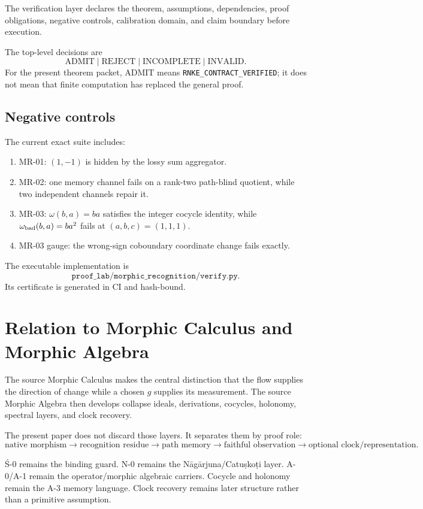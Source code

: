 \documentclass[11pt]{article}
\newcommand{\status}[1]{\texttt{#1}}
\begin{document}
The verification layer declares the theorem, assumptions, dependencies, proof obligations, negative controls, calibration domain, and claim boundary before execution.

The top-level decisions are
\[
\boxed{
\text{ADMIT}\mid\text{REJECT}\mid\text{INCOMPLETE}\mid\text{INVALID}.
}
\]
For the present theorem packet, ADMIT means \status{RNKE\_CONTRACT\_VERIFIED}; it does not mean that finite computation has replaced the general proof.

\subsection{Negative controls}

The current exact suite includes:
\begin{enumerate}
\item MR-01: \((1,-1)\) is hidden by the lossy sum aggregator.
\item MR-02: one memory channel fails on a rank-two path-blind quotient, while two independent channels repair it.
\item MR-03: \(\omega(b,a)=ba\) satisfies the integer cocycle identity, while \(\omega_{\rm bad}(b,a)=ba^2\) fails at \((a,b,c)=(1,1,1)\).
\item MR-03 gauge: the wrong-sign coboundary coordinate change fails exactly.
\end{enumerate}

The executable implementation is
\[
\texttt{proof\_lab/morphic\_recognition/verify.py}.
\]
Its certificate is generated in CI and hash-bound.

\section{Relation to Morphic Calculus and Morphic Algebra}

The source Morphic Calculus makes the central distinction that the flow supplies the direction of change while a chosen \(g\) supplies its measurement. The source Morphic Algebra then develops collapse ideals, derivations, cocycles, holonomy, spectral layers, and clock recovery.

The present paper does not discard those layers. It separates them by proof role:
\[
\boxed{
\text{native morphism}
\to
\text{recognition residue}
\to
\text{path memory}
\to
\text{faithful observation}
\to
\text{optional clock/representation}.
}
\]

Ś-0 remains the binding guard. N-0 remains the Nāgārjuna/Catuṣkoṭi layer. A-0/A-1 remain the operator/morphic algebraic carriers. Cocycle and holonomy remain the A-3 memory language. Clock recovery remains later structure rather than a primitive assumption.
\end{document}
